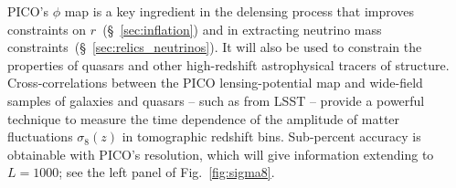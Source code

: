 \documentclass[PICOAPC.tex]{subfiles}
\begin{document}
PICO's $\phi$ map is a key ingredient in the delensing process that improves constraints on $r$~(\S~\ref{sec:inflation}) and in extracting neutrino mass constraints~(\S~\ref{sec:relics_neutrinos}). It will also be used to constrain the properties of quasars and other high-redshift astrophysical tracers of structure. 
Cross-correlations between the PICO lensing-potential map and wide-field samples of galaxies and quasars -- such as from LSST -- provide a powerful technique to measure the time dependence of the amplitude of matter fluctuations $\sigma_{8}(z)$ in tomographic redshift bins. Sub-percent accuracy is obtainable with PICO's resolution, which will give information extending to $L =1000$; see the left panel of Fig.~\ref{fig:sigma8}. 



\end{document}
